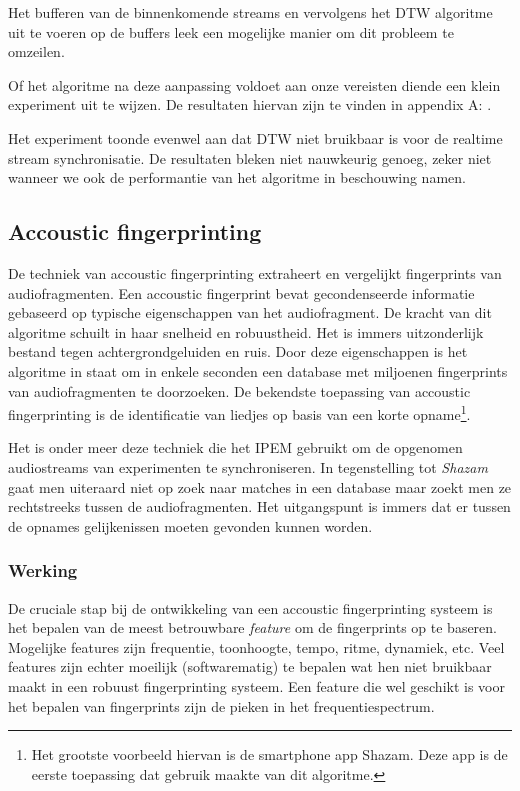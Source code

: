Het bufferen van de binnenkomende streams en vervolgens het DTW algoritme uit te voeren op de buffers leek een mogelijke manier om dit probleem te omzeilen.

Of het algoritme na deze aanpassing voldoet aan onze vereisten diende een klein experiment uit te wijzen. De resultaten hiervan zijn te vinden in appendix A: .

Het experiment toonde evenwel aan dat DTW niet bruikbaar is voor de realtime stream synchronisatie. De resultaten bleken niet nauwkeurig genoeg, zeker niet wanneer we ook de performantie van het algoritme in beschouwing namen.

\subsection{Accoustic fingerprinting}

De techniek van accoustic fingerprinting extraheert en vergelijkt fingerprints van audiofragmenten. Een accoustic fingerprint bevat gecondenseerde informatie gebaseerd op typische eigenschappen van het audiofragment. De kracht van dit algoritme schuilt in haar snelheid en robuustheid. Het is immers uitzonderlijk bestand tegen achtergrondgeluiden en ruis. Door deze eigenschappen is het algoritme in staat om in enkele seconden een database met miljoenen fingerprints van audiofragmenten te doorzoeken. De bekendste toepassing van accoustic fingerprinting is de identificatie van liedjes op basis van een korte opname\footnote{Het grootste voorbeeld hiervan is de smartphone app Shazam. Deze app is de eerste toepassing dat gebruik maakte van dit algoritme.}.

Het is onder meer deze techniek die het IPEM gebruikt om de opgenomen audiostreams van experimenten te synchroniseren. In tegenstelling tot \textit{Shazam} gaat men uiteraard niet op zoek naar matches in een database maar zoekt men ze rechtstreeks tussen de audiofragmenten. Het uitgangspunt is immers dat er tussen de opnames gelijkenissen moeten gevonden kunnen worden.

\subsubsection{Werking}


De cruciale stap bij de ontwikkeling van een accoustic fingerprinting systeem is het bepalen van de meest betrouwbare \textit{feature} om de fingerprints op te baseren. Mogelijke features zijn frequentie, toonhoogte, tempo, ritme, dynamiek, etc. Veel features zijn echter moeilijk (softwarematig) te bepalen wat hen niet bruikbaar maakt in een robuust fingerprinting systeem. Een feature die wel geschikt is voor het bepalen van fingerprints zijn de pieken in het frequentiespectrum.

